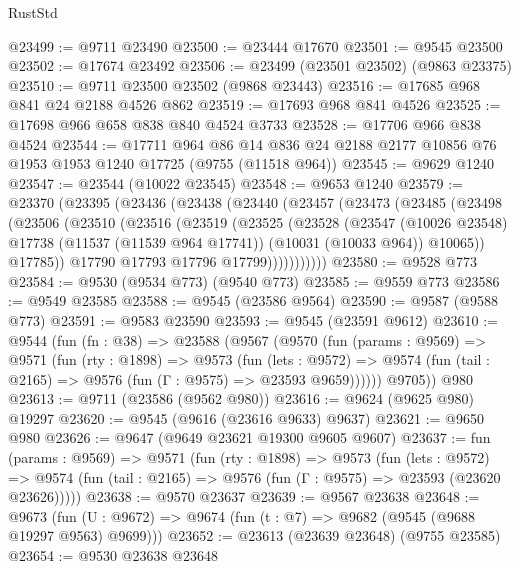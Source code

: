 \begin{lexlean}{RustStd}
\begin{coremodule}
@23499 := @9711 @23490
@23500 := @23444 @17670
@23501 := @9545 @23500
@23502 := @17674 @23492
@23506 := @23499 (@23501 @23502) (@9863 @23375)
@23510 := @9711 @23500 @23502 (@9868 @23443)
@23516 := @17685 @968 @841 @24 @2188 @4526 @862
@23519 := @17693 @968 @841 @4526
@23525 := @17698 @966 @658 @838 @840 @4524 @3733
@23528 := @17706 @966 @838 @4524
@23544 := @17711
    @964
    @86
    @14
    @836
    @24
    @2188
    @2177
    @10856
    @76
    @1953
    @1953
    @1240
    @17725
    (@9755 (@11518 @964))
@23545 := @9629 @1240
@23547 := @23544 (@10022 @23545)
@23548 := @9653 @1240
@23579 := @23370
    (@23395
      (@23436
        (@23438
          (@23440
            (@23457
              (@23473
                (@23485
                  (@23498
                    (@23506
                      (@23510
                        (@23516
                          (@23519
                            (@23525
                              (@23528
                                (@23547
                                  (@10026 @23548)
                                  @17738
                                  (@11537 (@11539 @964 @17741))
                                  (@10031 (@10033 @964))
                                  @10065))
                              @17785))
                          @17790
                          @17793
                          @17796
                          @17799)))))))))))
@23580 := @9528 @773
@23584 := @9530 (@9534 @773) (@9540 @773)
@23585 := @9559 @773
@23586 := @9549 @23585
@23588 := @9545 (@23586 @9564)
@23590 := @9587 (@9588 @773)
@23591 := @9583 @23590
@23593 := @9545 (@23591 @9612)
@23610 := @9544
    (fun (fn : @38) =>
    @23588
      (@9567
        (@9570
          (fun (params : @9569) =>
          @9571
            (fun (rty : @1898) =>
            @9573
              (fun (lets : @9572) =>
              @9574 (fun (tail : @2165) => @9576 (fun (Γ : @9575) => @23593 @9659))))))
        @9705))
    @980
@23613 := @9711 (@23586 (@9562 @980))
@23616 := @9624 (@9625 @980) @19297
@23620 := @9545 (@9616 (@23616 @9633) @9637)
@23621 := @9650 @980
@23626 := @9647 (@9649 @23621 @19300 @9605 @9607)
@23637 := fun (params : @9569) =>
  @9571
    (fun (rty : @1898) =>
    @9573
      (fun (lets : @9572) =>
      @9574 (fun (tail : @2165) => @9576 (fun (Γ : @9575) => @23593 (@23620 @23626)))))
@23638 := @9570 @23637
@23639 := @9567 @23638
@23648 := @9673
    (fun (U : @9672) => @9674 (fun (t : @7) => @9682 (@9545 (@9688 @19297 @9563) @9699)))
@23652 := @23613 (@23639 @23648) (@9755 @23585)
@23654 := @9530 @23638 @23648

\end{coremodule}
\end{lexlean}
